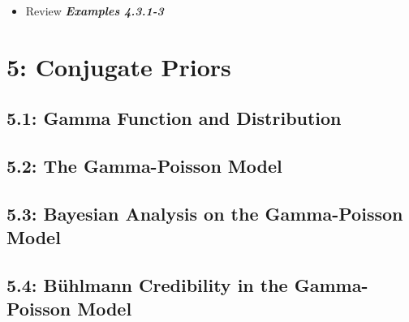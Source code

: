 \documentclass[
]{article}
\providecommand{\tightlist}{%
  \setlength{\itemsep}{0pt}\setlength{\parskip}{0pt}}
\begin{document}
\begin{itemize}
\tightlist
\item
  Review \textbf{\emph{Examples 4.3.1-3}}
\end{itemize}

\hypertarget{conjugate-priors}{%
\section{5: Conjugate Priors}\label{conjugate-priors}}

\hypertarget{gamma-function-and-distribution}{%
\subsection{5.1: Gamma Function and
Distribution}\label{gamma-function-and-distribution}}

\hypertarget{the-gamma-poisson-model}{%
\subsection{5.2: The Gamma-Poisson
Model}\label{the-gamma-poisson-model}}

\hypertarget{bayesian-analysis-on-the-gamma-poisson-model}{%
\subsection{5.3: Bayesian Analysis on the Gamma-Poisson
Model}\label{bayesian-analysis-on-the-gamma-poisson-model}}

\hypertarget{buxfchlmann-credibility-in-the-gamma-poisson-model}{%
\subsection{5.4: Bühlmann Credibility in the Gamma-Poisson
Model}\label{buxfchlmann-credibility-in-the-gamma-poisson-model}}
\end{document}
